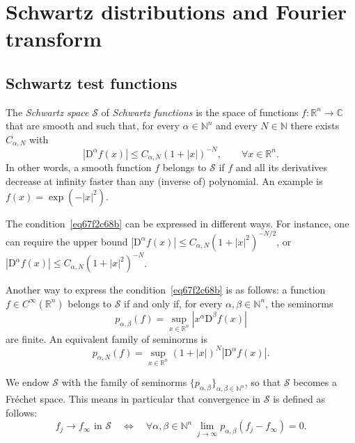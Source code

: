 \documentclass[a4paper,9pt]{amsart}
\newcommand{\scr}[1]{\mathscr{#1}}
\newcommand{\N}{\mathbb{N}}	%
\newcommand{\R}{\mathbb{R}}	%
\newcommand{\C}{\mathbb{C}}	%
\newcommand{\Diff}{\mathrm{D}}
\newcommand{\IFF}{\Leftrightarrow}	%
\theoremstyle{plain}
\theoremstyle{definition}
\theoremstyle{remark}
\begin{document}
\newpage
\section{Schwartz distributions and Fourier transform}\label{sec67e28d5a}

\subsection{Schwartz test functions}
The \emph{Schwartz space} $\scr S$ of \emph{Schwartz functions} is the space of functions $f:\R^n\to\C$ that are smooth and such that, for every $\alpha\in\N^n$ and every $N\in\N$ there exists $C_{\alpha,N}$ with
\begin{equation}\label{eq67f2c68b}
	|\Diff^\alpha f(x)| \le C_{\alpha,N} (1+|x|)^{-N} ,
	\qquad\forall x\in\R^n .
\end{equation}
In other words, a smooth function $f$ belongs to $\scr S$ if $f$ and all its derivatives decrease at infinity faster than any (inverse of) polynomial.
An example is $f(x) = \exp(-|x|^2)$.

The condition~\eqref{eq67f2c68b} can be expressed in different ways.
For instance, one can require the upper bound 
$|\Diff^\alpha f(x)| \le C_{\alpha,N} (1+|x|^2)^{-N/2}$,
or $|\Diff^\alpha f(x)| \le C_{\alpha,N} (1+|x|^2)^{-N}$.

Another way to express the condition~\eqref{eq67f2c68b} is as follows:
a function $f\in C^\infty(\R^n)$ belongs to $\scr S$ if and only if, for every $\alpha,\beta\in\N^n$, the seminorms
\begin{equation}
	p_{\alpha,\beta}(f) = \sup_{x\in\R^n} |x^\alpha\Diff^\beta f(x)| 
\end{equation}
are finite.
An equivalent family of seminorms is
\begin{equation}
	p_{\alpha,N}(f) = \sup_{x\in\R^n} (1+|x|)^N |\Diff^\alpha f(x)| .
\end{equation}

We endow $\scr S$ with the family of seminorms $\{p_{\alpha,\beta}\}_{\alpha,\beta\in\N^n}$, so that $\scr S$ becomes a Fréchet space.
This means in particular that convergence in $\scr S$ is defined as follows:
\begin{equation}\label{eq67fbfa93}
	f_j\to f_\infty \text{ in }\scr S
	\quad\IFF\quad
	\forall\alpha,\beta\in\N^n\ 
		\lim_{j\to\infty}p_{\alpha,\beta}(f_j-f_\infty) =0 .
\end{equation}
\end{document}
